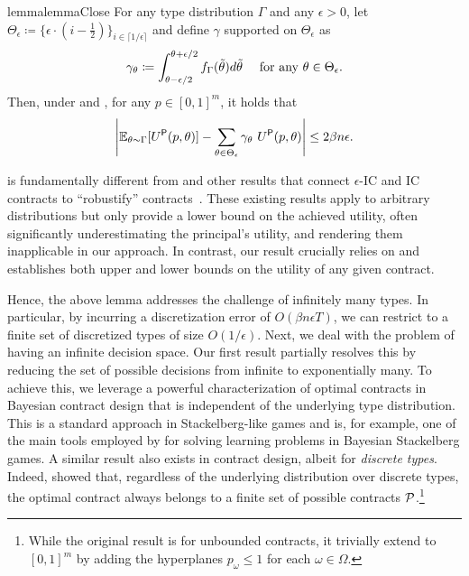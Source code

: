 \begin{restatable}{lemma}{lemmaClose}\label{lem:valClose}
    For any type distribution $\Gamma$ and any $\epsilon>0$, let $\Theta_\epsilon\coloneqq\{\epsilon\cdot(i-\frac{1}{2})\}_{i\in\lceil1/\epsilon\rceil}$ and define $\gamma$ supported on $\Theta_\epsilon$ as 
\[\gamma_{\theta}\coloneqq \int_{\theta-\epsilon/2}^{\theta+\epsilon/2} f_\Gamma(\tilde\theta) d\tilde\theta\quad\textnormal{ for any }\theta\in\Theta_\epsilon.\]
Then, under  and , for any $p \in [0,1]^m$, it holds that
    \[  
        \left|\mathbb{E}_{\theta\sim\Gamma}[U^\textsf{P}(p,\theta)]-\sum_{\theta\in \Theta_\epsilon}  \gamma_\theta \ U^\textsf{P}(p, \theta) \right|\le 2\beta n \epsilon.
    \] 
\end{restatable}

\begin{remark}
     is fundamentally different from  and other results that connect $\epsilon$-IC and IC contracts  to ``robustify'' contracts~\citep{dutting2021complexity,zhu2022online,bacchiocchi2023learning, bernasconi2024regret}. %
    These existing results apply to arbitrary distributions but only provide a lower bound on the achieved utility, often significantly underestimating the principal's utility, and rendering them inapplicable in our approach. 
    In contrast, our result crucially relies on  and establishes both upper and lower bounds on the utility of any given contract.
\end{remark}

Hence, the above lemma addresses the 
challenge of infinitely many types. In particular, by incurring a discretization error of $O(\beta n\epsilon T)$, we can restrict to a finite set of discretized types of size $O(1/\epsilon)$.
%
Next, we deal with the problem of having an infinite decision space. Our first result partially resolves this by reducing the set of possible decisions from infinite to exponentially many. 
To achieve this, we leverage a powerful characterization of optimal contracts in Bayesian contract design that is independent of the underlying type distribution. This is a standard approach in Stackelberg-like games and is, for example, one of the main tools employed by \citet{balcan2015commitment} for solving learning problems in Bayesian Stackelberg games. 
%
A similar result also exists in contract design, albeit for \emph{discrete types}. Indeed, \citet{castiglioni2022bayesian,guruganesh2021contracts} showed that, regardless of the underlying distribution over discrete types, the optimal contract always belongs to a finite set of possible contracts $\mathcal{P}$.\footnote{While the original result is for unbounded contracts, it trivially extend to $[0,1]^m$ by adding the hyperplanes $p_\omega\le1$ for each $\omega\in \Omega$.}


